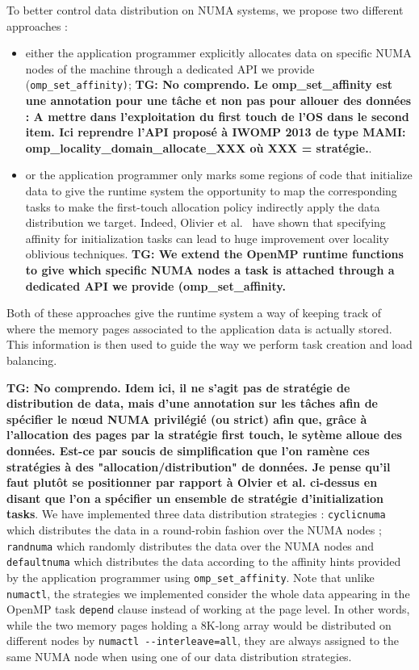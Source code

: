 \documentclass{Styles/llncs}
\newcommand{\TG}[1]{{\color{red}\bfseries TG: #1}}
\begin{document}
To better control data distribution on NUMA systems, we propose two different approaches :
\begin{itemize}
\item either the application programmer explicitly allocates data on specific NUMA nodes of the machine through a dedicated API we provide (\verb!omp_set_affinity)!;
\TG{No comprendo.  Le omp\_set\_affinity est une annotation pour une tâche et non pas pour allouer des données : A mettre dans l'exploitation du first touch de l'OS dans le second item. Ici reprendre l'API proposé à IWOMP 2013 de type MAMI: omp\_locality\_domain\_allocate\_XXX où XXX = stratégie.}.
\item or the application programmer only marks some regions of code that initialize data to give the runtime system the opportunity to map the corresponding tasks to make the first-touch allocation policy indirectly apply the data distribution we target. Indeed, Olivier et al.~\cite{Olivier:2012:CMW:2388996.2389085}
have shown that specifying affinity for initialization tasks can lead to huge improvement over locality oblivious techniques.
\TG{We extend the OpenMP runtime functions to give which specific NUMA nodes a task is attached  through a dedicated API we provide (omp\_set\_affinity.}
\end{itemize}
Both of these approaches give the runtime system a way of keeping track of where the memory pages associated to the application data is actually stored.
This information is then used to guide the way we perform task creation and load balancing.

\TG{No comprendo. Idem ici, il ne s'agit pas de stratégie de distribution de data, mais d'une annotation sur les tâches afin de spécifier le nœud NUMA privilégié (ou strict) afin que, grâce à l'allocation des pages par la stratégie first touch, le sytème alloue des données. Est-ce par soucis de simplification que l'on ramène ces stratégies à des "allocation/distribution" de données. Je pense qu'il faut plutôt se positionner par rapport à Olvier et al. ci-dessus en disant que l'on a spécifier un ensemble de stratégie d'initialization tasks}.
We have implemented three data distribution strategies : \verb!cyclicnuma! which distributes the data in a round-robin fashion over the NUMA nodes ; \verb!randnuma! which randomly distributes the data over the NUMA nodes and \verb!defaultnuma! which distributes the data according to the affinity hints provided by the application programmer using \verb!omp_set_affinity!.
Note that unlike \verb!numactl!, the strategies we implemented consider the whole data appearing in the OpenMP task \verb!depend! clause instead of working at the page level. In other words, while the two memory pages holding a 8K-long array would be distributed on different nodes by \verb!numactl --interleave=all!, they are always assigned to the same NUMA node when using one of our data distribution strategies.
\end{document}
